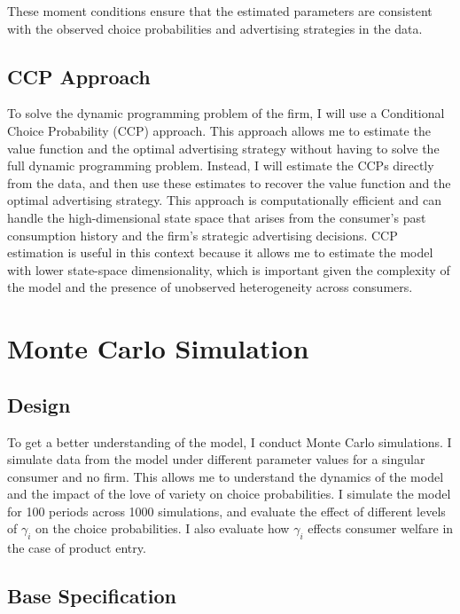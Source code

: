 \documentclass[12pt]{article}
\begin{document}
        These moment conditions ensure that the estimated parameters are consistent with the observed choice probabilities and advertising strategies in the data.

    \subsection{CCP Approach}

      To solve the dynamic programming problem of the firm, I will use a Conditional Choice Probability (CCP) approach. This approach allows me to estimate the value function and the optimal advertising strategy without having to solve the full dynamic programming problem. Instead, I will estimate the CCPs directly from the data, and then use these estimates to recover the value function and the optimal advertising strategy. This approach is computationally efficient and can handle the high-dimensional state space that arises from the consumer's past consumption history and the firm's strategic advertising decisions. CCP estimation is useful in this context because it allows me to estimate the model with lower state-space dimensionality, which is important given the complexity of the model and the presence of unobserved heterogeneity across consumers.

\section{Monte Carlo Simulation}

    \subsection{Design}
    To get a better understanding of the model, I conduct Monte Carlo simulations. I simulate data from the model under different parameter values for a singular consumer and no firm. This allows me to understand the dynamics of the model and the impact of the love of variety on choice probabilities. I simulate the model for 100 periods across 1000 simulations, and evaluate the effect of different levels of $\gamma_i$ on the choice probabilities. I also evaluate how $\gamma_i$ effects consumer welfare in the case of product entry.

    \subsection{Base Specification}
\end{document}
